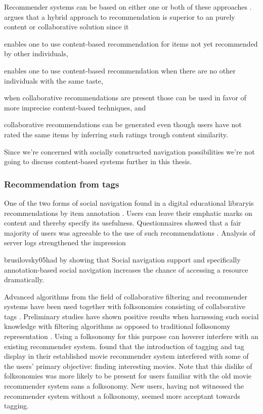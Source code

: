Recommender systems can be based on either one or both of these approaches
\citep[]{herlocker00}. \citet[]{balabanovic97} argues that a
hybrid approach to recommendation is superior to an purely content or
collaborative solution since it
\begin{inparaenum}[(i)]
  \item enables one to use content-based recommendation for items
    not yet recommended by other individuals,
  \item enables one to use content-based recommendation when there are
    no other individuals with the same taste,
  \item when collaborative recommendations are present those can be
    used in favor of more imprecise content-based techniques, and
  \item collaborative recommendations can be generated even though users
    have not rated the same items by inferring such ratings trough content
    similarity.
\end{inparaenum}
Since we're concerned with socially constructed navigation possibilities we're
not going to discuss content-based systems further in this thesis.

\subsubsection{Recommendation from tags}

One of the two forms of social navigation found in
\dash{}a digital educational
library\dash{}is recommendations by item
annotation \citep[]{brusilovsky05}. Users can leave their emphatic marks
on content and thereby specify its usefulness. Questionnaires showed that a
fair majority of users was agreeable to the use of such recommendations
\citeyearpar[]{brusilovsky05}. Analysis  of server logs strengthened
the impression
\begin{fullquote}[\p{38}]{brusilovsky05}{had by showing that}
  Social navigation support and specifically
  annotation-based social navigation increases the chance of
  accessing a resource dramatically.
\end{fullquote}

Advanced algorithms from the field of collaborative filtering
and recommender systems have been used together with folksonomies
consisting of collaborative tags
\citep[]{wu06}. Preliminary studies have shown positive
results when harnessing such social knowledge with filtering algorithms
as opposed to traditional folksonomy representation
\citep[]{wu06}.
Using a folksonomy for this purpose can hoverer interfere with an
existing recommender system. \citet[]{sen06} found that the
introduction of tagging and tag display in their established
movie recommender system interfered with some of the users' primary
objective: finding interesting movies. Note that this dislike of
folksonomies was more likely to be present for users familiar with the old
movie recommender system sans a folksonomy. New users, having not
witnessed the recommender system without a folksonomy, seemed more
acceptant towards tagging.


